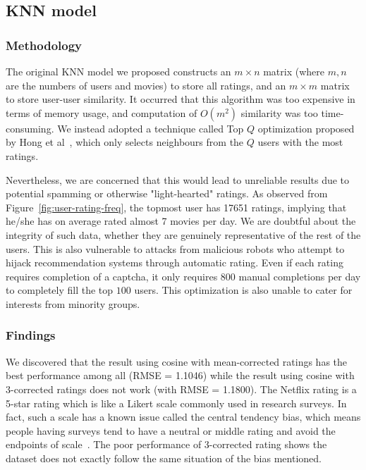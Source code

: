 \documentclass[final]{cvpr}
\begin{document}
\subsection{\ac{KNN} model}
\subsubsection{Methodology}
The original KNN model we proposed constructs an $m \times n$ matrix
(where $m, n$ are the numbers of users and movies) to store all ratings,
and an $m \times m$ matrix to store user-user similarity.
It occurred that this algorithm was too expensive in terms of memory usage,
and computation of $O(m^2)$ similarity was too time-consuming.
We instead adopted a technique called Top $Q$ optimization proposed by Hong et al~\cite{Alpher01},
which only selects neighbours from the $Q$ users with the most ratings.

Nevertheless, we are concerned that this would lead to unreliable results
due to potential spamming or otherwise "light-hearted" ratings.
As observed from Figure~\ref{fig:user-rating-freq},
the topmost user has 17651 ratings, implying that
he/she has on average rated almost 7 movies per day.
We are doubtful about the integrity of such data,
whether they are genuinely representative of the rest of the users.
This is also vulnerable to attacks from malicious robots
who attempt to hijack recommendation systems through automatic rating.
Even if each rating requires completion of a captcha,
it only requires 800 manual completions per day to completely fill the top $100$ users.
This optimization is also unable to cater for interests from minority groups.

\subsubsection{Findings}
We discovered that the result using cosine with mean-corrected ratings has the best performance among all (RMSE = 1.1046)
while the result using cosine with 3-corrected ratings does not work (with RMSE = 1.1800).
The Netflix rating is a 5-star rating which is like a Likert scale commonly used in research surveys.
In fact, such a scale has a known issue called the central tendency bias,
which means people having surveys tend to have a neutral or middle rating and avoid the endpoints of scale~\cite{stevens1971issues}.
The poor performance of 3-corrected rating shows the dataset does not exactly follow the same situation of the bias mentioned.
\end{document}
